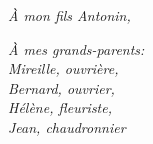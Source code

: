 \begin{flushright}
    \vspace{50mm}
    \textit{À mon fils Antonin,}
    \par \vspace{5mm}
    \textit{À mes grands-parents:\\
        Mireille, ouvrière, \\
        Bernard, ouvrier, \\
        Hélène, fleuriste, \\ 
        Jean, chaudronnier}
\end{flushright}
